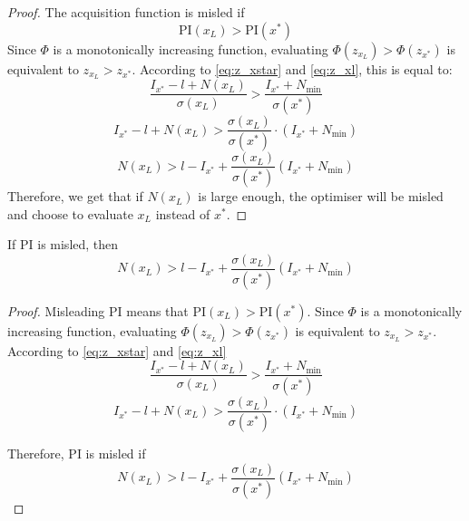 {\begin{proof}
The acquisition function is misled if
\begin{equation*}
    \mathrm{PI}(x_L) > \mathrm{PI}(x^*)
\end{equation*}
Since $\Phi$ is a monotonically increasing function, evaluating $\Phi(z_{x_L}) > \Phi(z_{x^*})$ is equivalent to $z_{x_L} > z_{x^*}$. According to \autoref{eq:z_xstar} and \autoref{eq:z_xl}, this is equal to:
\begin{equation*}
    \frac{I_{x^*} - l + N(x_L)}{\sigma(x_L)} > \frac{I_{x^*} + N_{\min}}{\sigma(x^*)}
\end{equation*}
\begin{equation*}
    I_{x^*} - l + N(x_L) > \frac{\sigma(x_L)}{\sigma(x^*)} \cdot (I_{x^*} + N_{\min})
\end{equation*}
\begin{equation*}
    N(x_L) > l - I_{x^*} + \frac{\sigma(x_L)}{\sigma(x^*)} (I_{x^*} + N_{\min})
\end{equation*}
Therefore, we get that if $N(x_L)$ is large enough, the optimiser will be misled and choose to evaluate $x_L$ instead of $x^*$.
\end{proof}

\begin{theorem}
If PI is misled, then
\begin{equation*}
    N(x_L) > l - I_{x^*} + \frac{\sigma(x_L)}{\sigma(x^*)} (I_{x^*} + N_{\min})
\end{equation*}

\end{theorem}

\begin{proof}
Misleading PI means that $\mathrm{PI}(x_L) > \mathrm{PI}(x^*)$. Since $\Phi$ is a monotonically increasing function, evaluating $\Phi(z_{x_L}) > \Phi(z_{x^*})$ is equivalent to $z_{x_L} > z_{x^*}$. According to \autoref{eq:z_xstar} and \autoref{eq:z_xl}
\begin{equation*}
    \frac{I_{x^*} - l + N(x_L)}{\sigma(x_L)} > \frac{I_{x^*} + N_{\min}}{\sigma(x^*)}
\end{equation*}
\begin{equation*}
    I_{x^*} - l + N(x_L) > \frac{\sigma(x_L)}{\sigma(x^*)} \cdot (I_{x^*} + N_{\min})
\end{equation*}

Therefore, PI is misled if
\begin{equation*}
    N(x_L) > l - I_{x^*} + \frac{\sigma(x_L)}{\sigma(x^*)} (I_{x^*} + N_{\min})
\end{equation*}
\end{proof}

}
